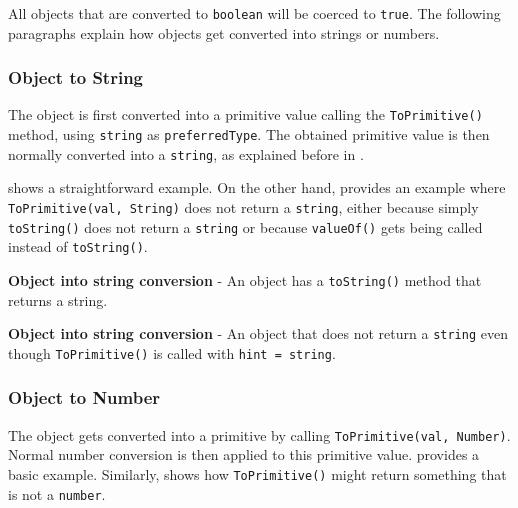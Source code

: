 All objects that are converted to \texttt{boolean} will be coerced to \texttt{true}. The following paragraphs explain how objects get converted into strings or numbers.

\subsubsection{Object to String}
The object is first converted into a primitive value calling the \texttt{ToPrimitive()} method, using \texttt{string} as \texttt{preferredType}. The obtained primitive value is then normally converted into a \texttt{string}, as explained before in .

 shows a straightforward example. On the other hand,  provides an example where \texttt{ToPrimitive(val, String)} does not return a \texttt{string}, either because simply \texttt{toString()} does not return a \texttt{string} or because \texttt{valueOf()} gets being called instead of \texttt{toString()}.

\begin{code}
	\captionsetup{aboveskip=0pt, belowskip=10pt}
	\caption[Object into string conversion]{\textbf{Object into string conversion} - An object has a \texttt{toString()} method that returns a string.}
	\label{code:background-object-into-string}
\end{code}

\begin{code}
	\captionsetup{aboveskip=0pt, belowskip=10pt}
	\caption[Object into string conversion]{\textbf{Object into string conversion} - An object that does not return a \texttt{string} even though \texttt{ToPrimitive()} is called with \texttt{hint = string}.}
	\label{code:background-object-into-string-not-string-return-value}
\end{code}

\subsubsection{Object to Number}
The object gets converted into a primitive by calling \texttt{ToPrimitive(val, Number)}. Normal number conversion is then applied to this primitive value.  provides a basic example. Similarly,  shows how \texttt{ToPrimitive()} might return something that is not a \texttt{number}.

